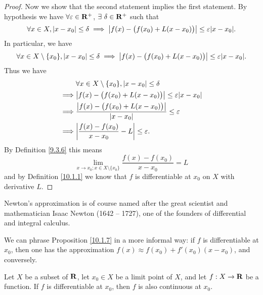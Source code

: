 \begin{proof}
    Now we show that the second statement implies the first statement.
    By hypothesis we have \(\forall \varepsilon \in \mathbf{R}^+\), \(\exists\ \delta \in \mathbf{R}^+\) such that
    \[
        \forall x \in X, \abs{x - x_0} \leq \delta \implies \abs{f(x) - \big(f(x_0) + L(x - x_0)\big)} \leq \varepsilon \abs{x - x_0}.
    \]
    In particular, we have
    \[
        \forall x \in X \setminus \{x_0\}, \abs{x - x_0} \leq \delta \implies \abs{f(x) - \big(f(x_0) + L(x - x_0)\big)} \leq \varepsilon \abs{x - x_0}.
    \]
    Thus we have
    \begin{align*}
                 & \forall x \in X \setminus \{x_0\}, \abs{x - x_0} \leq \delta                      \\
        \implies & \abs{f(x) - \big(f(x_0) + L(x - x_0)\big)} \leq \varepsilon \abs{x - x_0}         \\
        \implies & \frac{\abs{f(x) - \big(f(x_0) + L(x - x_0)\big)}}{\abs{x - x_0}} \leq \varepsilon \\
        \implies & \abs{\frac{f(x) - f(x_0)}{x - x_0} - L} \leq \varepsilon.
    \end{align*}
    By Definition \ref{9.3.6} this means
    \[
        \lim_{x \to x_0 ; x \in X \setminus \{x_0\}} \frac{f(x) - f(x_0)}{x - x_0} = L
    \]
    and by Definition \ref{10.1.1} we know that \(f\) is differentiable at \(x_0\) on \(X\) with derivative \(L\).
\end{proof}

\begin{remark}\label{10.1.8}
    Newton's approximation is of course named after the great scientist and mathematician Isaac Newton (1642 -- 1727), one of the founders of differential and integral calculus.
\end{remark}

\begin{remark}\label{10.1.9}
    We can phrase Proposition \ref{10.1.7} in a more informal way:
    if \(f\) is differentiable at \(x_0\), then one has the approximation \(f(x) \approx f(x_0) + f'(x_0)(x - x_0)\), and conversely.
\end{remark}

\begin{proposition}\label{10.1.10}
    Let \(X\) be a subset of \(\mathbf{R}\), let \(x_0 \in X\) be a limit point of \(X\), and let \(f : X \to \mathbf{R}\) be a function.
    If \(f\) is differentiable at \(x_0\), then \(f\) is also continuous at \(x_0\).
\end{proposition}

